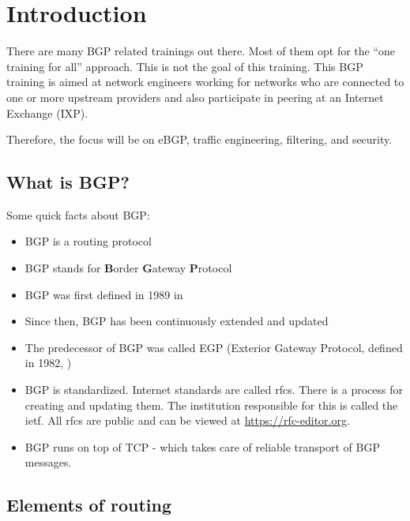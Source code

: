 \chapter{Introduction}
  There are many BGP related trainings out there. Most of them opt for the ``one training for all'' approach.
  This is not the goal of this training. This BGP training is aimed at network engineers working for
  networks who are connected to one or more upstream providers and also participate in peering at an Internet Exchange (IXP).

  Therefore, the focus will be on eBGP, traffic engineering, filtering, and security.

\section{What is BGP?}
Some quick facts about BGP:
\begin{itemize}
  \item BGP is a routing protocol
  \item BGP stands for \textbf{B}order \textbf{G}ateway \textbf{P}rotocol
  \item BGP was first defined in 1989 in 
  \item Since then, BGP has been continuously extended and updated
  \item The predecessor of BGP was called EGP
    (Exterior Gateway Protocol, defined in 1982, \cite{rfc827})
  \item BGP is standardized. Internet standards are called \glspl{rfc}.
    There is a process for creating and updating them.
    The institution responsible for this is called the \gls{ietf}.
    All \glspl{rfc} are public and can be viewed at \href{https://rfc-editor.org}{https://rfc-editor.org}.
  \item BGP runs on top of TCP - which takes care of reliable transport of BGP messages.
\end{itemize}

\section{Elements of routing}
